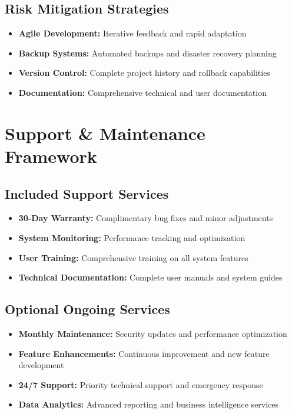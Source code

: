 \documentclass[11pt, letterpaper]{article}
\begin{document}
\subsection{Risk Mitigation Strategies}

\begin{itemize}[leftmargin=*]
    \item \textbf{Agile Development:} Iterative feedback and rapid adaptation
    \item \textbf{Backup Systems:} Automated backups and disaster recovery planning
    \item \textbf{Version Control:} Complete project history and rollback capabilities
    \item \textbf{Documentation:} Comprehensive technical and user documentation
\end{itemize}

\section{Support \& Maintenance Framework}

\subsection{Included Support Services}

\begin{itemize}[leftmargin=*]
    \item \textbf{30-Day Warranty:} Complimentary bug fixes and minor adjustments
    \item \textbf{System Monitoring:} Performance tracking and optimization
    \item \textbf{User Training:} Comprehensive training on all system features
    \item \textbf{Technical Documentation:} Complete user manuals and system guides
\end{itemize}

\subsection{Optional Ongoing Services}

\begin{itemize}[leftmargin=*]
    \item \textbf{Monthly Maintenance:} Security updates and performance optimization
    \item \textbf{Feature Enhancements:} Continuous improvement and new feature development
    \item \textbf{24/7 Support:} Priority technical support and emergency response
    \item \textbf{Data Analytics:} Advanced reporting and business intelligence services
\end{itemize}
\end{document}
